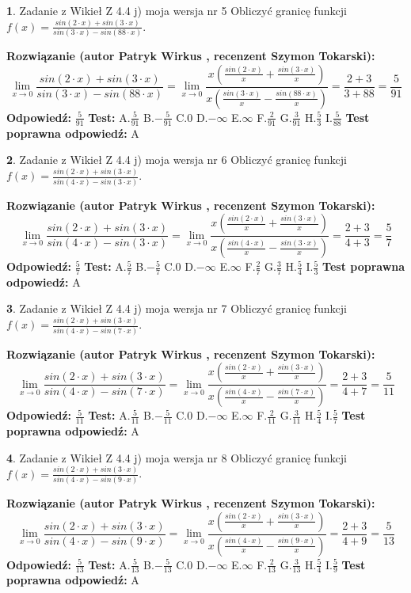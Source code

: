 \documentclass[12pt, a4paper]{article}
\theoremstyle{definition} %
\newtheorem{zad}{}
\newcommand{\zadStart}[1]{\begin{zad}#1\newline}
\newcommand{\zadStop}{\end{zad}}
\newcommand{\rozwStart}[2]{\noindent \textbf{Rozwiązanie (autor #1 , recenzent #2): }\newline}
\newcommand{\rozwStop}{\newline}
\newcommand{\odpStart}{\noindent \textbf{Odpowiedź:}\newline}
\newcommand{\odpStop}{\newline}
\newcommand{\testStart}{\noindent \textbf{Test:}\newline}
\newcommand{\testStop}{\newline}
\newcommand{\kluczStart}{\noindent \textbf{Test poprawna odpowiedź:}\newline}
\newcommand{\kluczStop}{\newline}
\begin{document}
\zadStart{Zadanie z Wikieł Z 4.4 j) moja wersja nr 5}
Obliczyć granicę funkcji $f(x)=\frac{sin(2\cdot x) +sin(3\cdot x)}{sin(3\cdot x) -sin(88\cdot x)}$.
\zadStop
\rozwStart{Patryk Wirkus}{Szymon Tokarski}
$$\lim\limits_{x\to 0}\frac{sin(2\cdot x) +sin(3\cdot x)}{sin(3\cdot x) -sin(88\cdot x)}=\lim\limits_{x\to 0}\frac{x(\frac{sin(2\cdot x)}{x}+\frac{sin(3\cdot x)}{x})}{x(\frac{sin(3\cdot x)}{x}-\frac{sin(88\cdot x)}{x})}=\frac{2+3}{3+88} = \frac{5}{91}$$
\rozwStop
\odpStart
$\frac{5}{91}$
\odpStop
\testStart
A.$\frac{5}{91}$
B.$-\frac{5}{91}$
C.$0$
D.$-\infty$
E.$\infty$
F.$\frac{2}{91}$
G.$\frac{3}{91}$
H.$\frac{5}{3}$
I.$\frac{5}{88}$
\testStop
\kluczStart
A
\kluczStop



\zadStart{Zadanie z Wikieł Z 4.4 j) moja wersja nr 6}
Obliczyć granicę funkcji $f(x)=\frac{sin(2\cdot x) +sin(3\cdot x)}{sin(4\cdot x) -sin(3\cdot x)}$.
\zadStop
\rozwStart{Patryk Wirkus}{Szymon Tokarski}
$$\lim\limits_{x\to 0}\frac{sin(2\cdot x) +sin(3\cdot x)}{sin(4\cdot x) -sin(3\cdot x)}=\lim\limits_{x\to 0}\frac{x(\frac{sin(2\cdot x)}{x}+\frac{sin(3\cdot x)}{x})}{x(\frac{sin(4\cdot x)}{x}-\frac{sin(3\cdot x)}{x})}=\frac{2+3}{4+3} = \frac{5}{7}$$
\rozwStop
\odpStart
$\frac{5}{7}$
\odpStop
\testStart
A.$\frac{5}{7}$
B.$-\frac{5}{7}$
C.$0$
D.$-\infty$
E.$\infty$
F.$\frac{2}{7}$
G.$\frac{3}{7}$
H.$\frac{5}{4}$
I.$\frac{5}{3}$
\testStop
\kluczStart
A
\kluczStop



\zadStart{Zadanie z Wikieł Z 4.4 j) moja wersja nr 7}
Obliczyć granicę funkcji $f(x)=\frac{sin(2\cdot x) +sin(3\cdot x)}{sin(4\cdot x) -sin(7\cdot x)}$.
\zadStop
\rozwStart{Patryk Wirkus}{Szymon Tokarski}
$$\lim\limits_{x\to 0}\frac{sin(2\cdot x) +sin(3\cdot x)}{sin(4\cdot x) -sin(7\cdot x)}=\lim\limits_{x\to 0}\frac{x(\frac{sin(2\cdot x)}{x}+\frac{sin(3\cdot x)}{x})}{x(\frac{sin(4\cdot x)}{x}-\frac{sin(7\cdot x)}{x})}=\frac{2+3}{4+7} = \frac{5}{11}$$
\rozwStop
\odpStart
$\frac{5}{11}$
\odpStop
\testStart
A.$\frac{5}{11}$
B.$-\frac{5}{11}$
C.$0$
D.$-\infty$
E.$\infty$
F.$\frac{2}{11}$
G.$\frac{3}{11}$
H.$\frac{5}{4}$
I.$\frac{5}{7}$
\testStop
\kluczStart
A
\kluczStop



\zadStart{Zadanie z Wikieł Z 4.4 j) moja wersja nr 8}
Obliczyć granicę funkcji $f(x)=\frac{sin(2\cdot x) +sin(3\cdot x)}{sin(4\cdot x) -sin(9\cdot x)}$.
\zadStop
\rozwStart{Patryk Wirkus}{Szymon Tokarski}
$$\lim\limits_{x\to 0}\frac{sin(2\cdot x) +sin(3\cdot x)}{sin(4\cdot x) -sin(9\cdot x)}=\lim\limits_{x\to 0}\frac{x(\frac{sin(2\cdot x)}{x}+\frac{sin(3\cdot x)}{x})}{x(\frac{sin(4\cdot x)}{x}-\frac{sin(9\cdot x)}{x})}=\frac{2+3}{4+9} = \frac{5}{13}$$
\rozwStop
\odpStart
$\frac{5}{13}$
\odpStop
\testStart
A.$\frac{5}{13}$
B.$-\frac{5}{13}$
C.$0$
D.$-\infty$
E.$\infty$
F.$\frac{2}{13}$
G.$\frac{3}{13}$
H.$\frac{5}{4}$
I.$\frac{5}{9}$
\testStop
\kluczStart
A
\kluczStop
\end{document}
